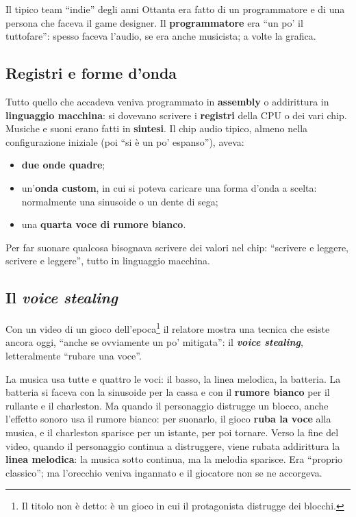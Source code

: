 Il tipico team ``indie'' degli anni Ottanta era fatto di un programmatore e di
una persona che faceva il game designer. Il \textbf{programmatore} era ``un po'
il tuttofare'': spesso faceva l'audio, se era anche musicista; a volte la
grafica.

\subsection{Registri e forme d'onda}

Tutto quello che accadeva veniva programmato in \textbf{assembly} o addirittura in
\textbf{linguaggio macchina}: si dovevano scrivere i \textbf{registri} della CPU
o dei vari chip. Musiche e suoni erano fatti in \textbf{sintesi}. Il chip audio
tipico, almeno nella configurazione iniziale (poi ``si è un po' espanso''),
aveva:
\begin{itemize}
  \item \textbf{due onde quadre};
  \item un'\textbf{onda custom}, in cui si poteva caricare una forma d'onda a
        scelta: normalmente una sinusoide o un dente di sega;
  \item una \textbf{quarta voce di rumore bianco}.
\end{itemize}
Per far suonare qualcosa bisognava scrivere dei valori nel chip: ``scrivere e
leggere, scrivere e leggere'', tutto in linguaggio macchina.

\subsection{Il \emph{voice stealing}}

Con un video di un gioco dell'epoca\footnote{Il titolo non è detto: è un gioco
in cui il protagonista distrugge dei blocchi.} il relatore mostra una tecnica
che esiste ancora oggi, ``anche se ovviamente un po' mitigata'': il
\textbf{\emph{voice stealing}}, letteralmente ``rubare una voce''.

La musica usa tutte e quattro le voci: il basso, la linea melodica, la batteria.
La batteria si faceva con la sinusoide per la cassa e con il \textbf{rumore
bianco} per il rullante e il charleston. Ma quando il personaggio distrugge un
blocco, anche l'effetto sonoro usa il rumore bianco: per suonarlo, il gioco
\textbf{ruba la voce} alla musica, e il charleston sparisce per un istante, per
poi tornare. Verso la fine del video, quando il personaggio continua a
distruggere, viene rubata addirittura la \textbf{linea melodica}: la musica sotto
continua, ma la melodia sparisce. Era ``proprio classico''; ma l'orecchio veniva
ingannato e il giocatore non se ne accorgeva.

